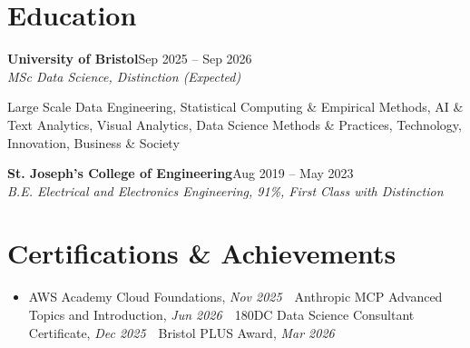 \documentclass[a4paper,11pt]{article}
\newcommand{\roleNoLoc}[3]{\textbf{#1}\hfill{\color{muted}#2}\\
  \textit{#3}\par}
\newcommand{\gap}{\vspace{5pt}}
\begin{document}
\section{Education}
\roleNoLoc{University of Bristol}{Sep 2025 – Sep 2026}{MSc Data Science, Distinction (Expected)}
{\color{muted}\small Large Scale Data Engineering, Statistical Computing \& Empirical Methods, AI \& Text Analytics, Visual Analytics, Data Science Methods \& Practices, Technology, Innovation, Business \& Society}\par
\gap
\roleNoLoc{St. Joseph's College of Engineering}{Aug 2019 – May 2023}{B.E. Electrical and Electronics Engineering, 91\%, First Class with Distinction}

\section{Certifications \& Achievements}
\begin{itemize}
  \item AWS Academy Cloud Foundations, \textit{Nov 2025} \,\textperiodcentered\, Anthropic MCP Advanced Topics and Introduction, \textit{Jun 2026} \,\textperiodcentered\, 180DC Data Science Consultant Certificate, \textit{Dec 2025} \,\textperiodcentered\, Bristol PLUS Award, \textit{Mar 2026}
\end{itemize}
\end{document}
